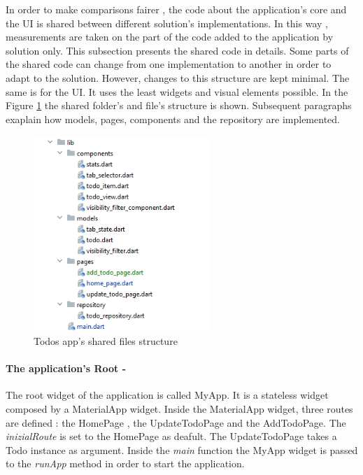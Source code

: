 In order to make comparisons fairer , the code about the application's core and the UI is shared between different solution's implementations. In this way , measurements are taken on the part of the code added to the application by solution only. This subsection presents the shared code in details. Some parts of the shared code can change from one implementation to another in order to adapt to the solution. However, changes to this structure are kept minimal. The same is for the UI. It uses the least widgets and visual elements possible. In the Figure \ref{fig:todo_app_shared_folder_structure} the shared folder's and file's structure is shown. Subsequent paragraphs exaplain how models, pages, components and the repository are implemented. 

		
		\begin{figure}[H]
		    \centering
		    \includegraphics[width=0.6\textwidth]{Images/folder_structure.png}
		    \caption{Todos app's shared files structure}
		    \label{fig:todo_app_shared_folder_structure}
		\end{figure}
		
		
		
\paragraph{The application's Root - }
		\label{par:todo_app_application_root}
The root widget of the application is called MyApp.
It is a stateless widget composed by a MaterialApp widget. Inside the MaterialApp widget, three routes are defined : the HomePage , the UpdateTodoPage and the AddTodoPage. The \textit{inizialRoute} is set to the HomePage as deafult. The UpdateTodoPage takes a Todo instance as argument. Inside the \textit{main} function the MyApp widget is passed to the \textit{runApp} method in order to start the application.


